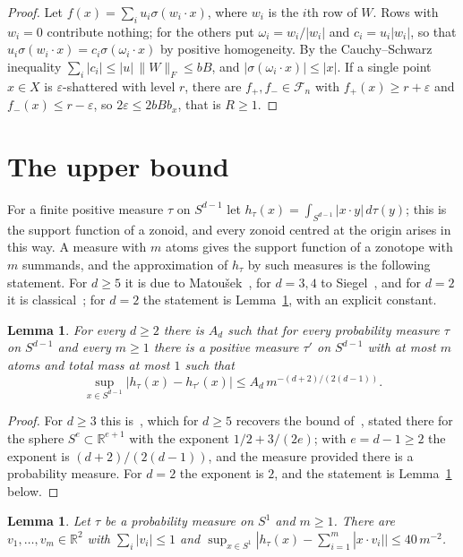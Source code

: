 \documentclass[11pt]{amsart}
\newtheorem{lemma}[theorem]{Lemma}
\theoremstyle{definition}
\theoremstyle{remark}
\numberwithin{equation}{section}
\newcommand{\RR}{\mathbb{R}}
\newcommand{\cF}{\mathcal{F}}
\begin{document}
\begin{proof}
Let $f(x)=\sum_iu_i\sigma(w_i\cdot x)$, where $w_i$ is the $i$th row of $W$. Rows with $w_i=0$ contribute nothing; for the others put $\omega_i=w_i/|w_i|$ and $c_i=u_i|w_i|$, so that $u_i\sigma(w_i\cdot x)=c_i\sigma(\omega_i\cdot x)$ by positive homogeneity. By the Cauchy--Schwarz inequality $\sum_i|c_i|\le|u|\,\|W\|_F\le bB$, and $|\sigma(\omega_i\cdot x)|\le|x|$. If a single point $x\in X$ is $\varepsilon$-shattered with level $r$, there are $f_+,f_-\in\cF_n$ with $f_+(x)\ge r+\varepsilon$ and $f_-(x)\le r-\varepsilon$, so $2\varepsilon\le2bBb_x$, that is $R\ge1$.
\end{proof}

\section{The upper bound}\label{sec:upper}

For a finite positive measure $\tau$ on $S^{d-1}$ let $h_\tau(x)=\int_{S^{d-1}}|x\cdot y|\,d\tau(y)$; this is the support function of a zonoid, and every zonoid centred at the origin arises in this way. A measure with $m$ atoms gives the support function of a zonotope with $m$ summands, and the approximation of $h_\tau$ by such measures is the following statement. For $d\ge5$ it is due to Matou\v{s}ek~\cite{Matousek}, for $d=3,4$ to Siegel~\cite[Theorem~1]{Siegel}, and for $d=2$ it is classical~\cite{MV}; for $d=2$ the statement is Lemma~\ref{lem:planar}, with an explicit constant.

\begin{lemma}\label{lem:zonoid}
For every $d\ge2$ there is $A_d$ such that for every probability measure $\tau$ on $S^{d-1}$ and every $m\ge1$ there is a positive measure $\tau'$ on $S^{d-1}$ with at most $m$ atoms and total mass at most $1$ such that
\[
\sup_{x\in S^{d-1}}|h_\tau(x)-h_{\tau'}(x)|\le A_d\,m^{-(d+2)/(2(d-1))}.
\]
\end{lemma}

\begin{proof}
For $d\ge3$ this is~\cite[Theorem~1]{Siegel}, which for $d\ge5$ recovers the bound of~\cite{Matousek}, stated there for the sphere $S^{e}\subset\RR^{e+1}$ with the exponent $1/2+3/(2e)$; with $e=d-1\ge2$ the exponent is $(d+2)/(2(d-1))$, and the measure provided there is a probability measure. For $d=2$ the exponent is $2$, and the statement is Lemma~\ref{lem:planar} below.
\end{proof}

\begin{lemma}\label{lem:planar}
Let $\tau$ be a probability measure on $S^{1}$ and $m\ge1$. There are $v_1,\dots,v_m\in\RR^2$ with $\sum_i|v_i|\le1$ and $\sup_{x\in S^1}|h_\tau(x)-\sum_{i=1}^m|x\cdot v_i||\le40\,m^{-2}$.
\end{lemma}
\end{document}

